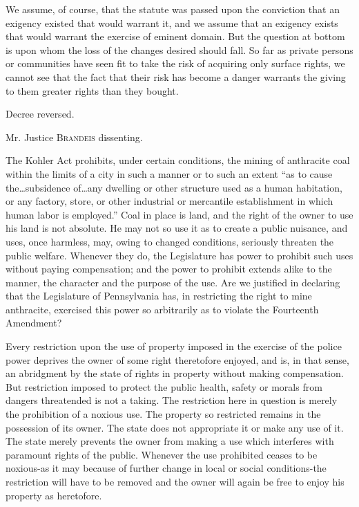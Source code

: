 We assume, of course, that the statute was passed upon the conviction that an
exigency existed that would warrant it, and we assume that an exigency exists
that would warrant the exercise of eminent domain. But the question at bottom is
upon whom the loss of the changes desired should fall. So far as private persons
or communities have seen fit to take the risk of acquiring only surface rights,
we cannot see that the fact that their risk has become a danger warrants the
giving to them greater rights than they bought.

Decree reversed.

\opinion Mr. Justice \textsc{Brandeis} dissenting.

The Kohler Act prohibits, under certain conditions, the mining of anthracite
coal within the limits of a city in such a manner or to such an extent ``as to
cause the\ldots subsidence of\ldots any dwelling or other structure used as a
human habitation, or any factory, store, or other industrial or mercantile
establishment in which human labor is employed.'' Coal in place is land, and the
right of the owner to use his land is not absolute. He may not so use it as to
create a public nuisance, and uses, once harmless, may, owing to changed
conditions, seriously threaten the public welfare. Whenever they do, the
Legislature has power to prohibit such uses without paying compensation; and the
power to prohibit extends alike to the manner, the character and the purpose of
the use. Are we justified in declaring that the Legislature of Pennsylvania has,
in restricting the right to mine anthracite, exercised this power so arbitrarily
as to violate the Fourteenth Amendment?

Every restriction upon the use of property imposed in the exercise of the police
power deprives the owner of some right theretofore enjoyed, and is, in that
sense, an abridgment by the state of rights in property without making
compensation. But restriction imposed to protect the public health, safety or
morals from dangers threatended is not a taking. The restriction here in
question is merely the prohibition of a noxious use. The property so restricted
remains in the possession of its owner. The state does not appropriate it or
make any use of it. The state merely prevents the owner from making a use which
interferes with paramount rights of the public. Whenever the use prohibited
ceases to be noxious-as it may because of further change in local or social
conditions-the restriction will have to be removed and the owner will again be
free to enjoy his property as heretofore.

